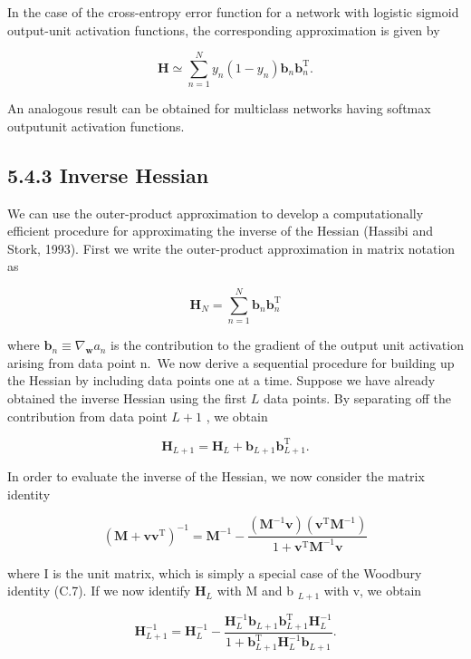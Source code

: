 \documentclass[
  10
]{article}
\begin{document}
In the case of the cross-entropy error function for a network with
logistic sigmoid output-unit activation functions, the corresponding
approximation is given by

\[
\mathbf {H} \simeq \sum_ {n = 1} ^ {N} y _ {n} (1 - y _ {n}) \mathbf {b} _ {n} \mathbf {b} _ {n} ^ {\mathrm{T}}.\tag{5.85}
\]

An analogous result can be obtained for multiclass networks having
softmax outputunit activation functions.

\subsection{5.4.3 Inverse Hessian}\label{inverse-hessian}

We can use the outer-product approximation to develop a computationally
efficient procedure for approximating the inverse of the Hessian
(Hassibi and Stork, 1993). First we write the outer-product
approximation in matrix notation as

\[
\mathbf {H} _ {N} = \sum_ {n = 1} ^ {N} \mathbf {b} _ {n} \mathbf {b} _ {n} ^ {\mathrm{T}}\tag{5.86}
\]

where
\(\mathbf { b } _ { n } \equiv \nabla _ { \mathbf { w } } a _ { n }\) is
the contribution to the gradient of the output unit activation arising
from data point n.~We now derive a sequential procedure for building up
the Hessian by including data points one at a time. Suppose we have
already obtained the inverse Hessian using the first \(L\) data points.
By separating off the contribution from data point \(L + 1\) , we obtain

\[
\mathbf {H} _ {L + 1} = \mathbf {H} _ {L} + \mathbf {b} _ {L + 1} \mathbf {b} _ {L + 1} ^ {\mathrm{T}}.\tag{5.87}
\]

In order to evaluate the inverse of the Hessian, we now consider the
matrix identity

\[
\left(\mathbf {M} + \mathbf {v v} ^ {\mathrm{T}}\right) ^ {- 1} = \mathbf {M} ^ {- 1} - \frac {\left(\mathbf {M} ^ {- 1} \mathbf {v}\right) \left(\mathbf {v} ^ {\mathrm{T}} \mathbf {M} ^ {- 1}\right)}{1 + \mathbf {v} ^ {\mathrm{T}} \mathbf {M} ^ {- 1} \mathbf {v}}\tag{5.88}
\]

where I is the unit matrix, which is simply a special case of the
Woodbury identity (C.7). If we now identify \(\mathbf { H } _ { L }\)
with M and b \(_ { L + 1 }\) with v, we obtain

\[
\mathbf {H} _ {L + 1} ^ {- 1} = \mathbf {H} _ {L} ^ {- 1} - \frac {\mathbf {H} _ {L} ^ {- 1} \mathbf {b} _ {L + 1} \mathbf {b} _ {L + 1} ^ {\mathrm{T}} \mathbf {H} _ {L} ^ {- 1}}{1 + \mathbf {b} _ {L + 1} ^ {\mathrm{T}} \mathbf {H} _ {L} ^ {- 1} \mathbf {b} _ {L + 1}}.\tag{5.89}
\]
\end{document}
